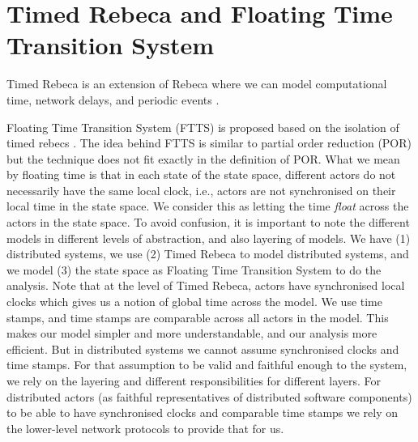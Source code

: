 \section{Timed Rebeca and Floating Time Transition System} \label{sec::FTTS}

Timed Rebeca is an extension of Rebeca where we can model computational time, network delays, and periodic events \cite{Arni}.

Floating Time Transition System (FTTS) is proposed based on the isolation of timed rebecs \cite{FACS2015,SCP}. The idea behind FTTS is similar to partial order reduction (POR) but the technique does not fit exactly in the definition of POR. What we mean by floating time is that in each state of the state space, different actors do not necessarily have the same local clock, i.e.,  actors are not synchronised on their local time in the state space. We consider this as letting the time \textit{float} across the actors in the state space. 
To avoid confusion, it is important to note the different models in different levels of abstraction, and also layering of models. We have (1) distributed systems, we use (2) Timed Rebeca to model distributed systems, and we model (3) the state space as Floating Time Transition System to do the analysis. 
%
Note that at the level of Timed Rebeca, actors have synchronised local clocks which gives us a notion of global time across the model. We use time stamps, and time stamps are comparable across all actors in the model. This makes our model simpler and more understandable, and our analysis more efficient.
But in distributed systems we cannot assume synchronised clocks and time stamps. 
For that assumption to be valid and faithful enough to the system,  we rely on the layering and different responsibilities for different layers. For distributed actors (as faithful representatives of distributed software components) to be able to have synchronised clocks and comparable time stamps we rely on the lower-level network protocols to provide that for us. 

